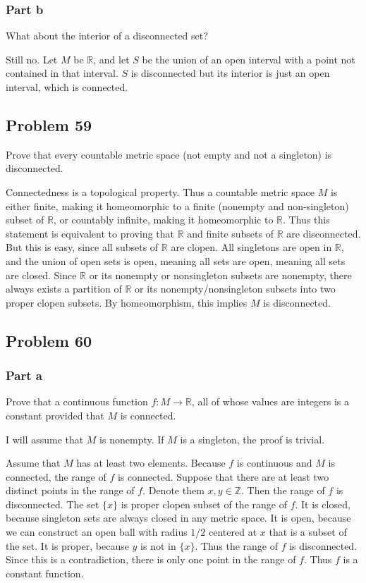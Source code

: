\documentclass{article}
\newcommand{\Z}{\mathbb{Z}}
\newcommand{\R}{\mathbb{R}}
\begin{document}
\subsubsection*{Part b}

What about the interior of a disconnected set?

Still no. Let $M$ be $\R$, and let $S$ be the union of an open interval with a point not contained in that interval. $S$ is disconnected but its interior is just an open interval, which is connected.

\subsection*{Problem 59}

Prove that every countable metric space (not empty and not a singleton) is disconnected.

Connectedness is a topological property. Thus a countable metric space $M$ is either finite, making it homeomorphic to a finite (nonempty and non-singleton) subset of $\R$, or countably infinite, making it homeomorphic to $\R$. Thus this statement is equivalent to proving that $\R$ and finite subsets of $\R$ are disconnected. But this is easy, since all subsets of $\R$ are clopen. All singletons are open in $\R$, and the union of open sets is open, meaning all sets are open, meaning all sets are closed. Since $\R$ or its nonempty or nonsingleton subsets are nonempty, there always exists a partition of $\R$ or its nonempty/nonsingleton subsets into two proper clopen subsets. By homeomorphism, this implies $M$ is disconnected.

\subsection*{Problem 60}

\subsubsection*{Part a}

Prove that a continuous function $f: M \rightarrow \R$, all of whose values are integers is a constant provided that $M$ is connected.

I will assume that $M$ is nonempty. If $M$ is a singleton, the proof is trivial.

Assume that $M$ has at least two elements. Because $f$ is continuous and $M$ is connected, the range of $f$ is connected. Suppose that there are at least two distinct points in the range of $f$. Denote them $x, y \in \Z$. Then the range of $f$ is disconnected. The set $\{x\}$ is proper clopen subset of the range of $f$. It is closed, because singleton sets are always closed in any metric space. It is open, because we can construct an open ball with radius $1/2$ centered at $x$ that is a subset of the set. It is proper, because $y$ is not in $\{x\}$. Thus the range of $f$ is disconnected. Since this is a contradiction, there is only one point in the range of $f$. Thus $f$ is a constant function.
\end{document}
